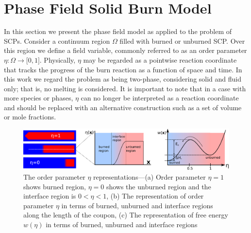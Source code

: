 \documentclass[colorinlistoftodos,review]{elsarticle}
\begin{document}
\section{Phase Field Solid Burn Model}\label{Phase Field Solid Burn Model} 

In this section we present the phase field model as applied to the problem of SCPs.
Consider a continuum region $\Omega$ filled with burned or unburned SCP.
Over this region we define a field variable, commonly referred to as an order parameter $\eta: \Omega \to \mathbb[0 , 1 ]$.
Physically, $\eta$ may be regarded as a pointwise reaction coordinate that tracks the progress of the burn reaction as a function of space and time.
In this work we regard the problem as being two-phase, considering solid and fluid only; that is, no melting is considered.
It is important to note that in a case with more species or phases, $\eta$ can no longer be interpreted as a reaction coordinate and should be replaced with an alternative construction such as a set of volume or mole fractions.

\begin{figure}
  \includegraphics[width=\linewidth]{figures/u_vs_eta.pdf}
  \caption{%
    The order parameter $\eta$ representations---(a) Order parameter $\eta=1$ shows burned region, $\eta=0$ shows the unburned region and the interface region is $0 < \eta < 1$, (b) The representation of order parameter $\eta$ in terms of burned, unburned and interface regions along the length of the coupon, (c) The representation of free energy $w(\eta)$ in terms of  burned, unburned and interface regions 
  }
  \label{fig:burn}
\end{figure}
\end{document}
